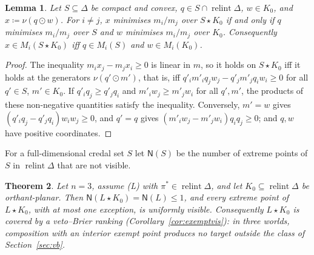 \documentclass[11pt]{article}
\DeclareMathOperator{\relint}{relint}
\theoremstyle{plain}
\newtheorem{theorem}{Theorem}[section]
\newtheorem{lemma}[theorem]{Lemma}
\theoremstyle{definition}
\theoremstyle{remark}
\begin{document}
\begin{lemma}\label{lem:decouple}
Let $S\subseteq\Delta$ be compact and convex, $q\in S\cap\relint\Delta$, $w\in K_0$, and
$x\coloneqq\nu(q\odot w)$. For $i\ne j$, $x$ minimises $m_i/m_j$ over $S\star K_0$ if and
only if $q$ minimises $m_i/m_j$ over $S$ and $w$ minimises $m_i/m_j$ over $K_0$.
Consequently $x\in M_i(S\star K_0)$ iff $q\in M_i(S)$ and $w\in M_i(K_0)$.
\end{lemma}

\begin{proof}
The inequality $m_ix_j-m_jx_i\ge0$ is linear in $m$, so it holds on $S\star K_0$ iff it
holds at the generators $\nu(q'\odot m')$, that is, iff $q'_im'_iq_jw_j-q'_jm'_jq_iw_i\ge0$
for all $q'\in S$, $m'\in K_0$. If $q'_iq_j\ge q'_jq_i$ and $m'_iw_j\ge m'_jw_i$ for all
$q',m'$, the products of these non-negative quantities satisfy the inequality. Conversely,
$m'=w$ gives $(q'_iq_j-q'_jq_i)w_iw_j\ge0$, and $q'=q$ gives $(m'_iw_j-m'_jw_i)q_iq_j\ge0$;
and $q,w$ have positive coordinates.
\end{proof}

For a full-dimensional credal set $S$ let $\mathsf N(S)$ be the number of extreme points of
$S$ in $\relint\Delta$ that are not visible.

\begin{theorem}\label{thm:n3}
Let $n=3$, assume (L) with $\pi^\ast\in\relint\Delta$, and let $K_0\subseteq\relint\Delta$
be orthant-planar. Then $\mathsf N(L\star K_0)=\mathsf N(L)\le1$, and every extreme point of
$L\star K_0$, with at most one exception, is uniformly visible. Consequently $L\star K_0$ is
covered by a veto--Brier ranking (Corollary~\ref{cor:exemptvis}): in three worlds,
composition with an interior exempt point produces no target outside the class of
Section~\ref{sec:vb}.
\end{theorem}
\end{document}
